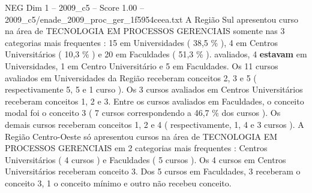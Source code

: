 \begin{textsample}{NEG Dim 1 – 2009\_c5 – Score 1.00 – 2009\_c5/enade\_2009\_proc\_ger\_1f5954ceea.txt}
A Região Sul apresentou curso na área de TECNOLOGIA EM PROCESSOS GERENCIAIS somente nas 3 categorias mais frequentes : 15 em Universidades ( 38,5 \% ), 4 em Centros Universitários ( 10,3 \% ) e 20 em Faculdades ( 51,3 \% ). avaliados, 4 \textbf{estavam} em Universidades, 1 em Centro Universitário e 5 em Faculdades.
Os 11 cursos avaliados em Universidades da Região receberam conceitos 2, 3 e 5 ( respectivamente 5, 5 e 1 curso ).
Os 3 cursos avaliados em Centros Universitários receberam conceitos 1, 2 e 3.
Entre os cursos avaliados em Faculdades, o conceito modal foi o conceito 3 ( 7 cursos correspondendo a 46,7 \% dos cursos ).
Os demais cursos receberam conceitos 1, 2 e 4 ( respectivamente, 1, 4 e 3 cursos ).
A Região Centro-Oeste só apresentou cursos na área de TECNOLOGIA EM PROCESSOS GERENCIAIS em 2 categorias mais frequentes : Centros Universitários ( 4 cursos ) e Faculdades ( 5 cursos ).
Os 4 cursos em Centros Universitários receberam conceito 3.
Dos 5 cursos em Faculdades, 3 receberam o conceito 3, 1 o conceito mínimo e outro não recebeu conceito.

\end{textsample}
